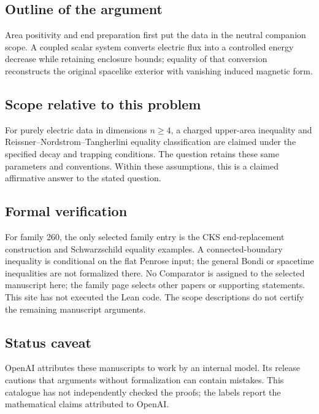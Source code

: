 \documentclass[11pt]{article}
\begin{document}
\subsection{Outline of the argument}
Area positivity and end preparation first put the data in the neutral companion scope. A coupled scalar system converts electric flux into a controlled energy decrease while retaining enclosure bounds; equality of that conversion reconstructs the original spacelike exterior with vanishing induced magnetic form.

\subsection{Scope relative to this problem}
For purely electric data in dimensions $n\geq4$, a charged upper-area inequality and Reissner--Nordstrom--Tangherlini equality classification are claimed under the specified decay and trapping conditions. The question retains these same parameters and conventions. Within these assumptions, this is a claimed affirmative answer to the stated question.

\subsection{Formal verification}
For family 260, the only selected family entry is the CKS end-replacement construction and Schwarzschild equality examples. A connected-boundary inequality is conditional on the flat Penrose input; the general Bondi or spacetime inequalities are not formalized there. No Comparator is assigned to the selected manuscript here; the family page selects other papers or supporting statements. This site has not executed the Lean code. The scope descriptions do not certify the remaining manuscript arguments.

\subsection{Status caveat}
OpenAI attributes these manuscripts to work by an internal model. Its release cautions that arguments without formalization can contain mistakes. This catalogue has not independently checked the proofs; the labels report the mathematical claims attributed to OpenAI.
\end{document}
